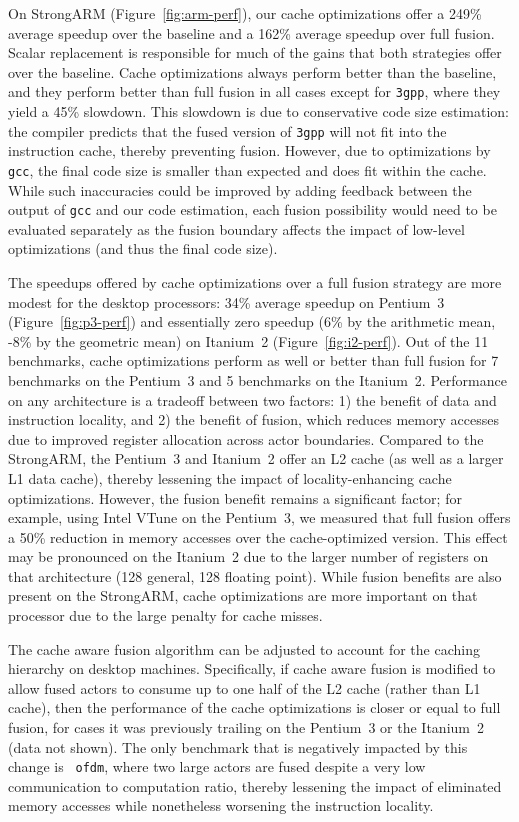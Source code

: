 \documentclass{sigplanconf}
\begin{document}
On StrongARM (Figure~\ref{fig:arm-perf}), our cache optimizations
offer a 249\% average speedup over the baseline and a 162\% average
speedup over full fusion.  Scalar replacement is responsible for much
of the gains that both strategies offer over the baseline.  Cache
optimizations always perform better than the baseline, and they
perform better than full fusion in all cases except for \texttt{3gpp},
where they yield a 45\% slowdown.  This slowdown is due to
conservative code size estimation: the compiler predicts that the
fused version of \texttt{3gpp} will not fit into the instruction
cache, thereby preventing fusion.  However, due to optimizations by
{\tt gcc}, the final code size is smaller than expected and does fit
within the cache.  While such inaccuracies could be improved by adding
feedback between the output of {\tt gcc} and our code estimation, each
fusion possibility would need to be evaluated separately as the fusion
boundary affects the impact of low-level optimizations (and thus the
final code size).

The speedups offered by cache optimizations over a full fusion
strategy are more modest for the desktop processors: 34\% average
speedup on Pentium~3 (Figure~\ref{fig:p3-perf}) and essentially zero
speedup (6\% by the arithmetic mean, -8\% by the geometric mean) on
Itanium~2 (Figure~\ref{fig:i2-perf}).  Out of the 11 benchmarks, cache
optimizations perform as well or better than full fusion for 7
benchmarks on the Pentium~3 and 5 benchmarks on the Itanium~2.
Performance on any architecture is a tradeoff between two factors: 1)
the benefit of data and instruction locality, and 2) the benefit of
fusion, which reduces memory accesses due to improved register
allocation across actor boundaries.  Compared to the StrongARM, the
Pentium~3 and Itanium~2 offer an L2 cache (as well as a larger L1 data
cache), thereby lessening the impact of locality-enhancing cache
optimizations.  However, the fusion benefit remains a significant
factor; for example, using Intel VTune on the Pentium~3, we measured
that full fusion offers a 50\% reduction in memory accesses over the
cache-optimized version.  This effect may be pronounced on the Itanium~2
due to the larger number of registers on that architecture (128
general, 128 floating point).  While fusion benefits are also present
on the StrongARM, cache optimizations are more important on that processor
due to the large penalty for cache misses.

The cache aware fusion algorithm can be adjusted to account for the
caching hierarchy on desktop machines.  Specifically, if cache aware
fusion is modified to allow fused actors to consume up to one half of
the L2 cache (rather than L1 cache), then the performance of the cache
optimizations is closer or equal to full fusion, for cases it was
previously trailing on the Pentium~3 or the Itanium~2 (data not shown).  The
only benchmark that is negatively impacted by this change is {\tt
ofdm}, where two large actors are fused despite a very low
communication to computation ratio, thereby lessening the impact of
eliminated memory accesses while nonetheless worsening the instruction
locality.
\end{document}
